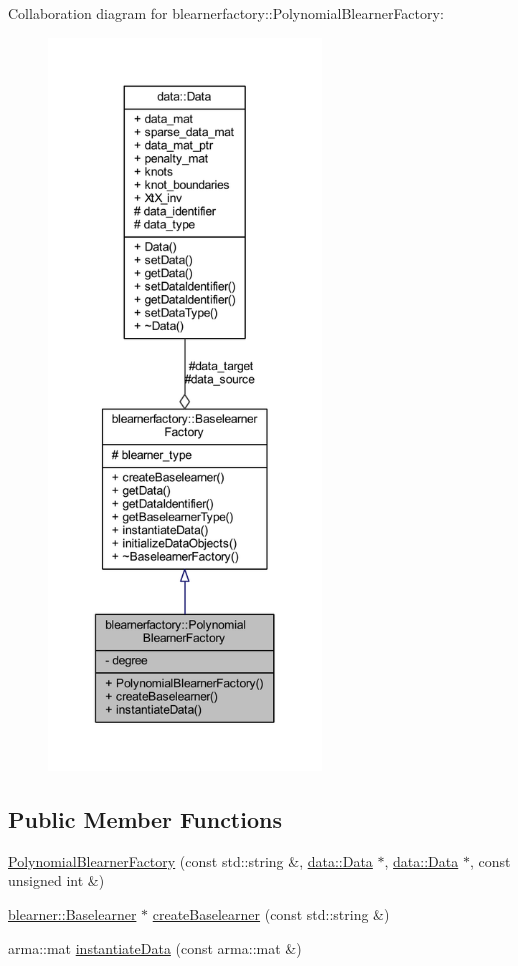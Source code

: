 Collaboration diagram for blearnerfactory\+:\+:Polynomial\+Blearner\+Factory\+:\nopagebreak
\begin{figure}[H]
\begin{center}
\leavevmode
\includegraphics[height=550pt]{classblearnerfactory_1_1_polynomial_blearner_factory__coll__graph}
\end{center}
\end{figure}
\subsection*{Public Member Functions}
\begin{DoxyCompactItemize}
\item 
\mbox{\hyperlink{classblearnerfactory_1_1_polynomial_blearner_factory_a87a3247a9abe49009e1e951f25ed97cf}{Polynomial\+Blearner\+Factory}} (const std\+::string \&, \mbox{\hyperlink{classdata_1_1_data}{data\+::\+Data}} $\ast$, \mbox{\hyperlink{classdata_1_1_data}{data\+::\+Data}} $\ast$, const unsigned int \&)
\item 
\mbox{\hyperlink{classblearner_1_1_baselearner}{blearner\+::\+Baselearner}} $\ast$ \mbox{\hyperlink{classblearnerfactory_1_1_polynomial_blearner_factory_ac0c7f742da0a2de444e91a0cfb0a9384}{create\+Baselearner}} (const std\+::string \&)
\item 
arma\+::mat \mbox{\hyperlink{classblearnerfactory_1_1_polynomial_blearner_factory_aeea9c480671ae7cf7d3be470ce0feaef}{instantiate\+Data}} (const arma\+::mat \&)
\end{DoxyCompactItemize}
